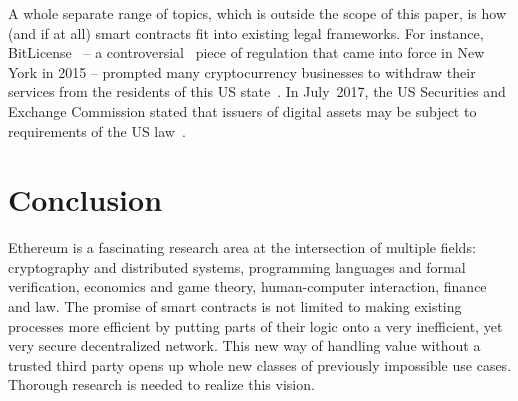 A whole separate range of topics, which is outside the scope of this paper, is how (and if at all) smart contracts fit into existing legal frameworks.
For instance, BitLicense~\cite{BitLicense} -- a controversial~\cite{StopTheBitLicense} piece of regulation that came into force in New York in 2015 -- prompted many cryptocurrency businesses to withdraw their services from the residents of this US state~\cite{Roberts2015}.
In July~2017, the US Securities and Exchange Commission stated that issuers of digital assets may be subject to requirements of the US law~\cite{SEC17}.


\section{Conclusion}

Ethereum is a fascinating research area at the intersection of multiple fields: cryptography and distributed systems, programming languages and formal verification, economics and game theory, human-computer interaction, finance and law.
The promise of smart contracts is not limited to making existing processes more efficient by putting parts of their logic onto a very inefficient, yet very secure decentralized network.
This new way of handling value without a trusted third party opens up whole new classes of previously impossible use cases.
Thorough research is needed to realize this vision.

